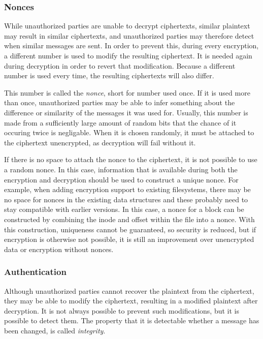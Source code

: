 \subsubsection{Nonces}

While unauthorized parties are unable to decrypt ciphertexts, similar plaintext
may result in similar ciphertexts, and unauthorized parties may therefore detect
when similar messages are sent. In order to prevent this, during every
encryption, a different number is used to modify the resulting ciphertext. It is
needed again during decryption in order to revert that modification. Because a
different number is used every time, the resulting ciphertexts will also differ.

This number is called the \emph{nonce}, short for number used once. If it is
used more than once, unauthorized parties may be able to infer something about
the difference or similarity of the messages it was used for. Usually, this
number is made from a sufficiently large amount of random bits that the chance
of it occuring twice is negligable. When it is chosen randomly, it must be
attached to the ciphertext unencrypted, as decryption will fail without it.

If there is no space to attach the nonce to the ciphertext, it is not possible
to use a random nonce. In this case, information that is available during both
the encryption and decryption should be used to construct a unique nonce. For
example, when adding encryption support to existing filesystems, there may be no
space for nonces in the existing data structures and these probably need to stay
compatible with earlier versions. In this case, a nonce for a block can be
constructed by combining the inode and offset within the file into a nonce. With
this construction, uniqueness cannot be guaranteed, so security is reduced, but
if encryption is otherwise not possible, it is still an improvement over
unencrypted data or encryption without nonces.

\subsubsection{Authentication}

Although unauthorized parties cannot recover the plaintext from the ciphertext,
they may be able to modify the ciphertext, resulting in a modified plaintext
after decryption. It is not always possible to prevent such modifications, but
it is possible to detect them. The property that it is detectable whether a
message has been changed, is called \emph{integrity}.

